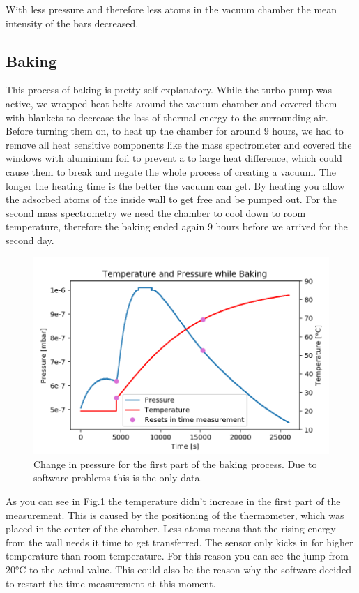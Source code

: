\documentclass[]{article}
\begin{document}
With less pressure and therefore less atoms in the vacuum chamber the mean intensity of the bars decreased. 

\subsection{Baking}
This process of baking is pretty self-explanatory. While the turbo pump was active, we wrapped heat belts around the vacuum chamber and covered them with blankets to decrease the loss of thermal energy to the surrounding air. Before turning them on, to heat up the chamber for around 9 hours, we had to remove all heat sensitive components like the mass spectrometer and covered the windows with aluminium foil to prevent a to large heat difference, which could cause them to break and negate the whole process of creating a vacuum.
The longer the heating time is the better the vacuum can get. By heating you allow the adsorbed atoms of the inside wall to get free and be pumped out. 
For the second mass spectrometry we need the chamber to cool down to room temperature, therefore the baking ended again 9 hours before we arrived for the second day.

\begin{figure}[h]
\centering\includegraphics[width=.75\textwidth]{Plots/Baking.png}
\caption{Change in pressure for the first part of the baking process. Due to software problems this is the only data.}
\label{fig::baking}
\end{figure}

As you can see in Fig.\ref{fig::baking} the temperature didn't increase in the first part of the measurement. This is caused by the positioning of the thermometer, which was placed in the center of the chamber. Less atoms means that the rising energy from the wall needs it time to get transferred. 
The sensor only kicks in for higher temperature than room temperature. For this reason you can see the jump from 20°C to the actual value. This could also be the reason why the software decided to restart the time measurement at this moment. 
\end{document}
